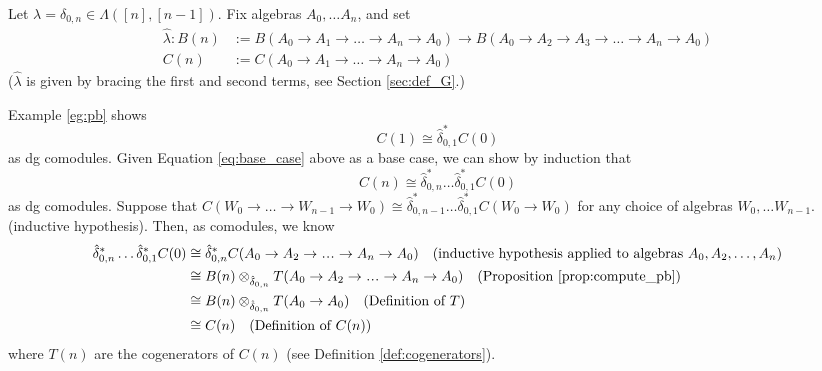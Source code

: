 %
\begin{eg} 
  \label{eg:pb2}
Let $\lambda = \delta_{0,n} \in 
\Lambda([n],[n-1])$. Fix algebras 
$A_0, \dots A_n$, and set
\begin{align*}
\hat{\lambda}: B(n)
&:= B(A_0 \to A_1 \to \dots \to A_n \to A_0) 
  \to B(A_0 \to A_2 \to A_3 \to \dots \to A_n \to A_0)\\
C(n) 
&:= C(A_0 \to A_1 \to \dots \to A_n \to A_0)
\end{align*}
($\hat{\lambda}$ is given by bracing the 
first and second terms, see Section \ref{sec:def_G}.)

Example \ref{eg:pb} shows
\begin{equation} \label{eq:base_case}
C(1) \cong \hat{\delta}_{0,1}^*C(0)
\end{equation}
as dg comodules. Given Equation 
\ref{eq:base_case} above as a base 
case, we can show by induction that 
$$
C(n) \cong \hat{\delta}_{0,n}^*\dots\hat{\delta}_{0,1}^*C(0)
$$ 
as dg comodules. Suppose that 
$C(W_0 \to \dots \to W_{n-1} \to W_0) 
\cong \hat{\delta}_{0,n-1}^* \dots \hat{\delta}_{0,1}^*
C(W_0 \to W_0)$ for any 
choice of algebras $W_0, \dots W_{n-1}$.
(inductive hypothesis). Then, as 
comodules, we know
\begin{align*}
\hat{\delta}_{0,n}^*\dots\hat{\delta}_{0,1}^*C(0)
& \cong
  \hat{\delta}_{0,n}^*C(A_0 \to A_2 \to \smdots \to A_n \to A_0)
  \quad \textrm{(inductive hypothesis applied to algebras } 
  A_0, A_2,\dots,A_n)\\
& \cong 
  B(n) \otimes_{\hat{\delta}_{0,n}} 
  T(A_0 \to A_2 \to \smdots \to A_n \to A_0)
  \quad \textrm{(Proposition 
  \ref{prop:compute_pb})}\\
& \cong 
  B(n) \otimes_{\hat{\delta}_{0,n}} 
  T(A_0 \to A_0)
  \quad \textrm{(Definition of $T$)} \\
& \cong 
  C(n)
  \quad \textrm{(Definition of $C(n)$)}
\end{align*}
where $T(n)$ are the cogenerators of 
$C(n)$ (see Definition 
\ref{def:cogenerators}).


\end{eg}
